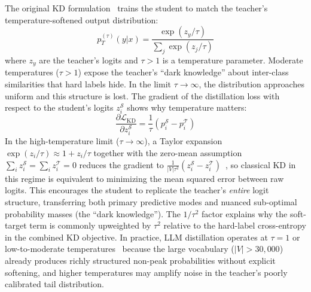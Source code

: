 \documentclass{article} %
\newcommand{\loss}{\mathcal{L}}
\begin{document}
The original KD formulation~\citep{1503.02531} trains the student to match the teacher's temperature-softened output distribution:
\begin{equation*}
    p_T^{(\tau)}(y|x) = \frac{\exp(z_y / \tau)}{\sum_{j} \exp(z_j / \tau)}
\end{equation*}
where $z_y$ are the teacher's logits and $\tau > 1$ is a temperature parameter. Moderate temperatures ($\tau > 1$) expose the teacher's ``dark knowledge'' about inter-class similarities that hard labels hide. In the limit $\tau \to \infty$, the distribution approaches uniform and this structure is lost. The gradient of the distillation loss with respect to the student's logits $z_i^{\mathcal{S}}$ shows why temperature matters:
\begin{equation*}
    \frac{\partial \loss_{\text{KD}}}{\partial z_i^{\mathcal{S}}} = \frac{1}{\tau}(p_i^{\mathcal{S}} - p_i^{\mathcal{T}})
\end{equation*}
In the high-temperature limit ($\tau \to \infty$), a Taylor expansion $\exp(z_i/\tau) \approx 1 + z_i/\tau$ together with the zero-mean assumption $\sum_i z_i^{\mathcal{S}} = \sum_i z_i^{\mathcal{T}} = 0$ reduces the gradient to $\frac{1}{|V|\tau^2}(z_i^{\mathcal{S}} - z_i^{\mathcal{T}})$~\citep{1503.02531}, so classical KD in this regime is equivalent to minimizing the mean squared error between raw logits. This encourages the student to replicate the teacher's \emph{entire} logit structure, transferring both primary predictive modes and nuanced sub-optimal probability masses (the ``dark knowledge''). The $1/\tau^2$ factor explains why the soft-target term is commonly upweighted by $\tau^2$ relative to the hard-label cross-entropy in the combined KD objective. In practice, LLM distillation operates at $\tau = 1$ or low-to-moderate temperatures~\citep{2402.11890} because the large vocabulary ($|V| > 30{,}000$) already produces richly structured non-peak probabilities without explicit softening, and higher temperatures may amplify noise in the teacher's poorly calibrated tail distribution.
\end{document}
